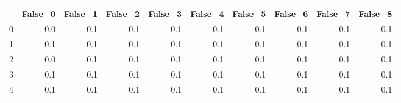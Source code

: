 \begin{tabular}{lrrrrrrrrr}
\toprule
{} &  False\_0 &  False\_1 &  False\_2 &  False\_3 &  False\_4 &  False\_5 &  False\_6 &  False\_7 &  False\_8 \\ \hline
\midrule
0 &      0.0 &      0.1 &      0.1 &      0.1 &      0.1 &      0.1 &      0.1 &      0.1 &      0.1 \\ \hline
1 &      0.1 &      0.1 &      0.1 &      0.1 &      0.1 &      0.1 &      0.1 &      0.1 &      0.1 \\ \hline
2 &      0.0 &      0.1 &      0.1 &      0.1 &      0.1 &      0.1 &      0.1 &      0.1 &      0.1 \\ \hline
3 &      0.1 &      0.1 &      0.1 &      0.1 &      0.1 &      0.1 &      0.1 &      0.1 &      0.1 \\ \hline
4 &      0.1 &      0.1 &      0.1 &      0.1 &      0.1 &      0.1 &      0.1 &      0.1 &      0.1 \\ \hline
\bottomrule
\end{tabular}
